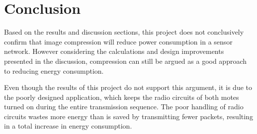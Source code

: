 \chapter{Conclusion}
Based on the results and discussion sections, this project does not conclusively confirm that image compression will reduce power consumption in a sensor network. 
However considering the calculations and design improvements presented in the discussion, compression can still be argued as a good approach to reducing energy consumption.
 
Even though the results of this project do not support this argument, it is due to the poorly designed application, which keeps the radio circuits of both motes turned on during the entire transmission sequence.
The poor handling of radio circuits wastes more energy than is saved by transmitting fewer packets, resulting in a total increase in energy consumption. 

